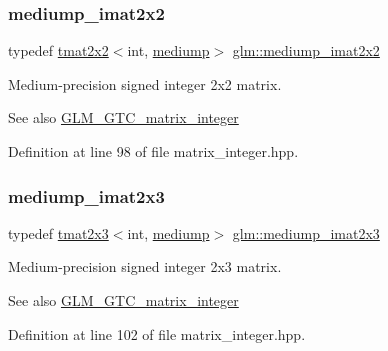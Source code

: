 \subsubsection{\texorpdfstring{mediump\_imat2x2}{mediump\_imat2x2}}
{\footnotesize\ttfamily typedef \mbox{\hyperlink{structglm_1_1tmat2x2}{tmat2x2}}$<$int, \mbox{\hyperlink{namespaceglm_a0f04f086094c747d227af4425893f545a6416f3ea0c9025fb21ed50c4d6620482}{mediump}}$>$ \mbox{\hyperlink{group__gtc__matrix__integer_ga52a40f2f95562746fd8084726a300963}{glm\+::mediump\+\_\+imat2x2}}}

Medium-\/precision signed integer 2x2 matrix. \begin{DoxySeeAlso}{See also}
\mbox{\hyperlink{group__gtc__matrix__integer}{G\+L\+M\+\_\+\+G\+T\+C\+\_\+matrix\+\_\+integer}} 
\end{DoxySeeAlso}


Definition at line 98 of file matrix\+\_\+integer.\+hpp.

\mbox{\label{group__gtc__matrix__integer_ga07314e9f05b82367570ca44c3ef7c0a7}} 
\subsubsection{\texorpdfstring{mediump\_imat2x3}{mediump\_imat2x3}}
{\footnotesize\ttfamily typedef \mbox{\hyperlink{structglm_1_1tmat2x3}{tmat2x3}}$<$int, \mbox{\hyperlink{namespaceglm_a0f04f086094c747d227af4425893f545a6416f3ea0c9025fb21ed50c4d6620482}{mediump}}$>$ \mbox{\hyperlink{group__gtc__matrix__integer_ga07314e9f05b82367570ca44c3ef7c0a7}{glm\+::mediump\+\_\+imat2x3}}}

Medium-\/precision signed integer 2x3 matrix. \begin{DoxySeeAlso}{See also}
\mbox{\hyperlink{group__gtc__matrix__integer}{G\+L\+M\+\_\+\+G\+T\+C\+\_\+matrix\+\_\+integer}} 
\end{DoxySeeAlso}


Definition at line 102 of file matrix\+\_\+integer.\+hpp.

\mbox{\label{group__gtc__matrix__integer_ga944a139f15de6bc12e9c7bf615ffc4f5}} 
